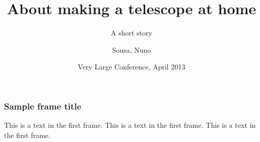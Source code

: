 \documentclass{beamer}
\title[Amateur Telescope Making]
{About making a telescope at home}
\subtitle{A short story}
\author[Sousa, Nuno] %
{Sousa, Nuno}
\date[2021] %
{Very Large Conference, April 2013}
\begin{document}
\frame{\titlepage}

\begin{frame}
\frametitle{Sample frame title}
This is a text in the first frame. This is a text in the first frame. This is a text in the first frame.
\end{frame}
\end{document}
